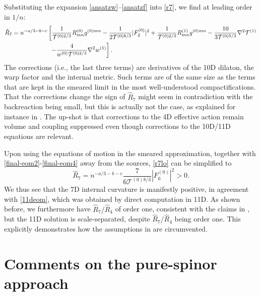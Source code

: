 \documentclass[11pt]{article}
\newcommand{\nl}{\notag \\ &\quad\,}
\renewcommand{\[}{\left[}
\renewcommand{\]}{\right]}
\renewcommand{\(}{\left(}
\renewcommand{\)}{\right)}
\newcommand{\<}{\langle}
\renewcommand{\>}{\rangle}
\begin{document}
Substituting the expansion \eqref{ansatzw}--\eqref{ansatzf} into \eqref{r7}, we find at leading order in $1/n$:
\begin{align}
\hat R_7 &= n^{-a/3-b-c} \left[ \frac{1}{\mathcal{T}^{(0)2/3}}R^{(0)}_{mn}g^{(0)mn} -\frac{1}{2\mathcal{T}^{(0)8/3}}|F_2^{(0)}|^2 + \frac{1}{\mathcal{T}^{(0)2/3}}R^{(1)}_{mn}g^{(0)mn} -\frac{10}{3\mathcal{T}^{(0)5/3}} \nabla^2 \mathcal{T}^{(1)} \right. \nl\qquad\qquad\quad \left.
  - \frac{4}{w^{(0)}\mathcal{T}^{(0)2/3}} \nabla^2 w^{(1)} 
\right]. \label{r7lo}
\end{align}
The corrections (i.e., the last three terms) are derivatives of the 10D dilaton, the warp factor and the internal metric. Such terms are of the same size as the terms that are kept in the smeared limit in the most well-understood compactifications. That the corrections change the sign of $\hat R_7$ might seem in contradiction with the backreaction being small, but this is actually not the case, as explained for instance in \cite{Blaback:2010sj, Junghans:2013xza, Junghans:2020acz}. The up-shot is that corrections to the 4D effective action remain volume and coupling suppressed even though corrections to the 10D/11D equations are relevant.

Upon using the equations of motion in the smeared approximation, together with \eqref{final-eom2}-\eqref{final-eom4} away from the sources, \eqref{r7lo} can be simplified to 
\begin{equation}
    \label{r7final}
\hat R_7 = n^{-a/3-b-c} \frac{7}{6\mathcal{T}^{(0)8/3}}|F_6^{(0)}|^2 > 0.
\end{equation}
We thus see that the 7D internal curvature is manifestly positive, in agreement with \eqref{11deom}, which was obtained by direct computation in 11D. As shown before, we furthermore have $\hat{R}_7/\hat{R}_4$ of order one, consistent with the claims in \cite{Gautason:2015tig}, but the 11D solution is scale-separated, despite $\hat{R}_7/\hat{R}_4$ being order one. This explicitly demonstrates how the assumptions in \cite{Gautason:2015tig} are circumvented.

\section{Comments on the pure-spinor approach}
\label{sec:purespinorloc}
\end{document}
